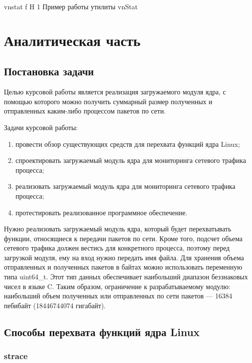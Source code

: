 \documentclass{bmstu}
\begin{document}
    {vnstat}
    {f}
    {H}
    {1\textwidth}
    {Пример работы утилиты vnStat}

\chapter{Аналитическая часть}

\section{Постановка задачи}

Целью курсовой работы является реализация загружаемого модуля ядра, с помощью которого можно получить суммарный размер полученных и отправленных каким-либо процессом пакетов по сети.

Задачи курсовой работы:
\begin{enumerate}
\item[1)] провести обзор существующих средств для перехвата функций ядра Linux;
\item[2)] спроектировать загружаемый модуль ядра для мониторинга сетевого трафика процесса;
\item[3)] реализовать загружаемый модуль ядра для мониторинга сетевого трафика процесса;
\item[4)] протестировать реализованное программное обеспечение.
\end{enumerate}

Нужно реализовать загружаемый модуль ядра, который будет перехватывать функции, относящиеся к передачи пакетов по сети. 
Кроме того, подсчет объема сетевого трафика должен вестись для конкретного процесса, поэтому перед загрузкой модуля, ему на вход нужно передать имя файла. 
Для хранения объема отправленных и полученных пакетов в байтах можно использовать переменную типа uint64\_t. 
Этот тип данных обеспечивает наибольший диапазон беззнаковых чисел в языке C. 
Таким образом, ограничение к разрабатываемому модулю: наибольший объем полученных или отправленных по сети пакетов --- 16384 пебибайт (18446744074 гигабайт).

\section{Способы перехвата функций ядра Linux}

\subsection{strace}
\end{document}
